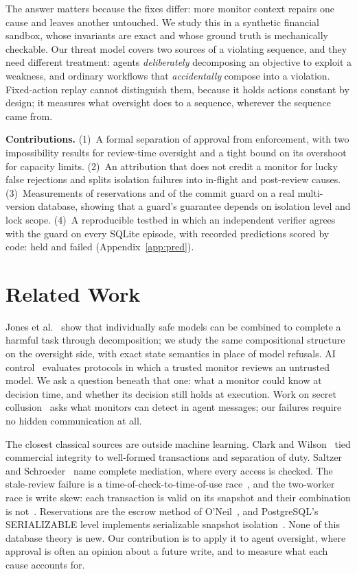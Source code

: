 \documentclass[10pt]{article}
\begin{document}
The answer matters because the fixes differ: more monitor context repairs one cause and leaves another untouched. We study this in a synthetic financial sandbox, whose invariants are exact and whose ground truth is mechanically checkable. Our threat model covers two sources of a violating sequence, and they need different treatment: agents \emph{deliberately} decomposing an objective to exploit a weakness, and ordinary workflows that \emph{accidentally} compose into a violation. Fixed-action replay cannot distinguish them, because it holds actions constant by design; it measures what oversight does to a sequence, wherever the sequence came from.

\textbf{Contributions.} (1)~A formal separation of approval from enforcement, with two impossibility results for review-time oversight and a tight bound on its overshoot for capacity limits. (2)~An attribution that does not credit a monitor for lucky false rejections and splits isolation failures into in-flight and post-review causes. (3)~Measurements of reservations and of the commit guard on a real multi-version database, showing that a guard's guarantee depends on isolation level and lock scope. (4)~A reproducible testbed in which an independent verifier agrees with the guard on every SQLite episode, with \predTotal{} recorded predictions scored by code: \predHeld{} held and \predFailed{} failed (Appendix~\ref{app:pred}).

\section{Related Work}
Jones et al.~\cite{jones2024} show that individually safe models can be combined to complete a harmful task through decomposition; we study the same compositional structure on the oversight side, with exact state semantics in place of model refusals. AI control~\cite{greenblatt2023} evaluates protocols in which a trusted monitor reviews an untrusted model. We ask a question beneath that one: what a monitor could know at decision time, and whether its decision still holds at execution. Work on secret collusion~\cite{motwani2024} asks what monitors can detect in agent messages; our failures require no hidden communication at all.

The closest classical sources are outside machine learning. Clark and Wilson~\cite{clark1987} tied commercial integrity to well-formed transactions and separation of duty. Saltzer and Schroeder~\cite{saltzer1975} name complete mediation, where every access is checked. The stale-review failure is a time-of-check-to-time-of-use race~\cite{bishop1996}, and the two-worker race is write skew: each transaction is valid on its snapshot and their combination is not~\cite{berenson1995,fekete2005}. Reservations are the escrow method of O'Neil~\cite{oneil1986}, and PostgreSQL's SERIALIZABLE level implements serializable snapshot isolation~\cite{ports2012}. None of this database theory is new. Our contribution is to apply it to agent oversight, where approval is often an opinion about a future write, and to measure what each cause accounts for.
\end{document}
